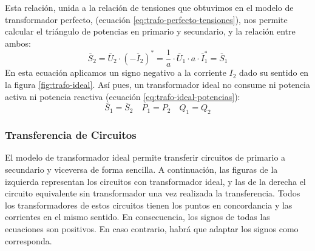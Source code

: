 Esta relación, unida a la relación de tensiones que obtuvimos en el modelo de transformador perfecto, (ecuación \ref{eq:trafo-perfecto-tensiones}), nos permite calcular el triángulo de potencias en primario y secundario, y la relación entre ambos:
\[
  \overline{S}_2 = \overline{U}_2 \cdot (-\overline{I}_2)^* = \frac{1}{a} \cdot
  \overline{U}_1 \cdot a \cdot \overline{I}_1^* = \overline{S}_1
  \]
En esta ecuación aplicamos un signo negativo a la corriente $I_2$ dado su sentido en la figura \ref{fig:trafo-ideal}. Así pues, un transformador ideal no consume ni potencia activa ni potencia reactiva (ecuación \ref{eq:trafo-ideal-potencias}):
\begin{equation}
  \label{eq:trafo-ideal-potencias}
  \boxed{\overline{S}_1 = \overline{S}_2} \quad \boxed{P_1 = P_2}
  \quad \boxed{Q_1 = Q_2}
  \end{equation}

  \subsubsection{Transferencia de Circuitos}
\label{sec:transferencia-circuitos}

El modelo de transformador ideal permite transferir circuitos de primario a secundario y viceversa de forma sencilla. A continuación, las figuras de la izquierda representan los circuitos con transformador ideal, y las de la derecha el circuito equivalente sin transformador una vez realizada la transferencia. Todos los transformadores de estos circuitos tienen los puntos en concordancia y las corrientes en el mismo sentido. En consecuencia, los signos de todas las ecuaciones son positivos. En caso contrario, habrá que adaptar los signos como corresponda.  

